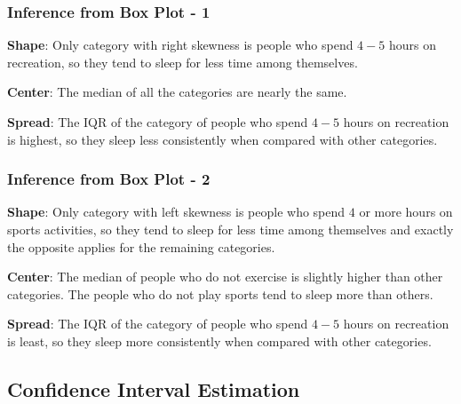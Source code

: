 \documentclass[11pt,]{beamer}
\begin{document}
\begin{frame}

    \frametitle{Inference from Box Plot - 1}
    
    \textbf{Shape}: Only category with right skewness is people who spend $4-5$ hours on recreation, so they tend to sleep for less time among themselves. 
    
    \bigskip
    
    \textbf{Center}:  The median of all the categories are nearly the same.
    
    \bigskip
    
    \textbf{Spread}: The IQR of the category of people who spend $4-5$ hours on recreation is highest, so they sleep less consistently when compared with other categories.
    
\end{frame}

\begin{frame}
    
    \frametitle{Inference from Box Plot - 2}
    
    \textbf{ Shape}: Only category with left skewness is people who spend $4$ or more hours on sports activities, so they tend to sleep for less time among themselves and exactly the opposite applies for the remaining categories.
    
    \bigskip
    
    \textbf{ Center}:  The median of people who do not exercise is slightly higher than other categories. The people who do not play sports tend to sleep more than others. 
    
    \bigskip
    
    \textbf{Spread}: The IQR of the category of people who spend $4-5$ hours on recreation is least, so they sleep more consistently when compared with other categories. 
    
\end{frame}

\subsection{Confidence Interval Estimation}
\end{document}
